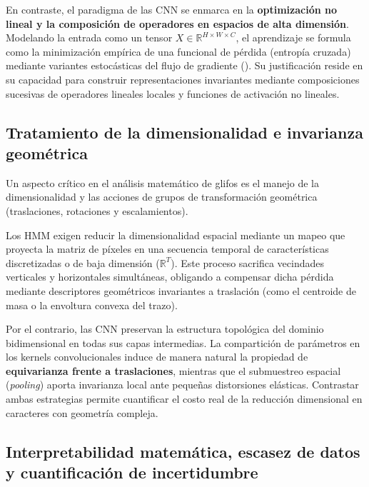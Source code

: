 \documentclass[
  spanish,
  us-letterpaper,
]{scrreprt}
\theoremstyle{definition}
\theoremstyle{remark}
\begin{document}
En contraste, el paradigma de las CNN se enmarca en la
\textbf{optimización no lineal y la composición de operadores en
espacios de alta dimensión}. Modelando la entrada como un tensor
\(X \in \mathbb{R}^{H \times W \times C}\), el aprendizaje se formula
como la minimización empírica de una funcional de pérdida (entropía
cruzada) mediante variantes estocásticas del flujo de gradiente
(). Su justificación reside
en su capacidad para construir representaciones invariantes mediante
composiciones sucesivas de operadores lineales locales y funciones de
activación no lineales.

\subsection{Tratamiento de la dimensionalidad e invarianza
geométrica}\label{tratamiento-de-la-dimensionalidad-e-invarianza-geomuxe9trica}

Un aspecto crítico en el análisis matemático de glifos es el manejo de
la dimensionalidad y las acciones de grupos de transformación geométrica
(traslaciones, rotaciones y escalamientos).

Los HMM exigen reducir la dimensionalidad espacial mediante un mapeo que
proyecta la matriz de píxeles en una secuencia temporal de
características discretizadas o de baja dimensión (\(\mathbb{R}^T\)).
Este proceso sacrifica vecindades verticales y horizontales simultáneas,
obligando a compensar dicha pérdida mediante descriptores geométricos
invariantes a traslación (como el centroide de masa o la envoltura
convexa del trazo).

Por el contrario, las CNN preservan la estructura topológica del dominio
bidimensional en todas sus capas intermedias. La compartición de
parámetros en los kernels convolucionales induce de manera natural la
propiedad de \textbf{equivarianza frente a traslaciones}, mientras que
el submuestreo espacial (\emph{pooling}) aporta invarianza local ante
pequeñas distorsiones elásticas. Contrastar ambas estrategias permite
cuantificar el costo real de la reducción dimensional en caracteres con
geometría compleja.

\subsection{Interpretabilidad matemática, escasez de datos y
cuantificación de
incertidumbre}\label{interpretabilidad-matemuxe1tica-escasez-de-datos-y-cuantificaciuxf3n-de-incertidumbre}
\end{document}
